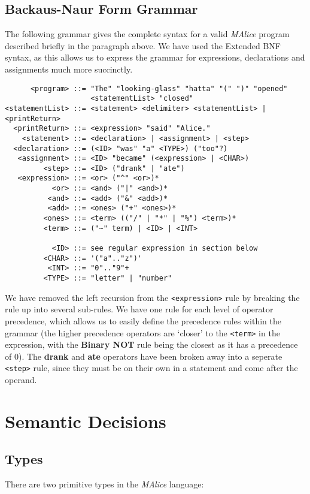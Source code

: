 \documentclass[11pt]{article}
\begin{document}
\subsection*{Backaus-Naur Form Grammar}
The following grammar gives the complete syntax for a valid \emph{MAlice} program described briefly in the paragraph above. We have used the Extended BNF syntax, as this allows us to express the grammar for expressions, declarations and assignments much more succinctly.
\begin{verbatim}
      <program> ::= "The" "looking-glass" "hatta" "(" ")" "opened" 
                    <statementList> "closed"
<statementList> ::= <statement> <delimiter> <statementList> | <printReturn>
  <printReturn> ::= <expression> "said" "Alice."
    <statement> ::= <declaration> | <assignment> | <step>
  <declaration> ::= (<ID> "was" "a" <TYPE>) ("too"?)
   <assignment> ::= <ID> "became" (<expression> | <CHAR>)
         <step> ::= <ID> ("drank" | "ate")
   <expression> ::= <or> ("^" <or>)*
           <or> ::= <and> ("|" <and>)*
          <and> ::= <add> ("&" <add>)*
          <add> ::= <ones> ("+" <ones>)*
         <ones> ::= <term> (("/" | "*" | "%") <term>)*
         <term> ::= ("~" term) | <ID> | <INT>
         
           <ID> ::= see regular expression in section below
         <CHAR> ::= '("a".."z")'
          <INT> ::= "0".."9"+
         <TYPE> ::= "letter" | "number"
\end{verbatim}

We have removed the left recursion from the \texttt{<expression>} rule by breaking the rule up into several sub-rules. We have one rule for each level of operator precedence, which allows us to easily define the precedence rules within the grammar (the higher precedence operators are \textquoteleft closer\textquoteright{} to the \texttt{<term>} in the expression, with the \textbf{Binary NOT} rule being the closest as it has a precedence of 0). The \textbf{drank} and \textbf{ate} operators have been broken away into a seperate \texttt{<step>} rule, since they must be on their own in a statement and come after the operand. 

\section*{Semantic Decisions}
\subsection*{Types}
There are two primitive types in the \emph{MAlice} language:
\end{document}
